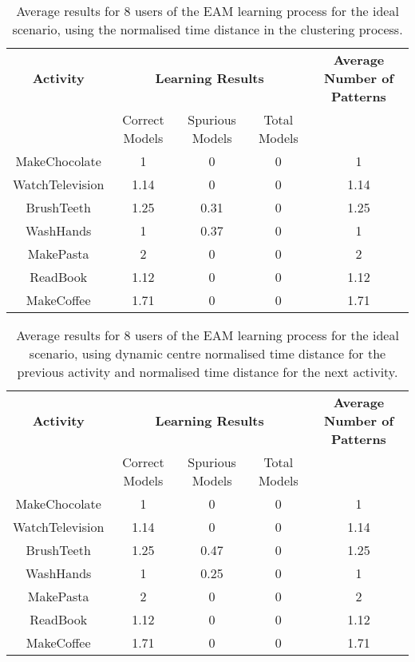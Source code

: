 \begin{table}[htbp]\scriptsize
  \begin{center}
        \begin{tabular}{ccccc}
            \hline            
            \textbf{Activity} & \multicolumn{3}{c}{\textbf{Learning Results}} & \textbf{Average Number of Patterns} \\
             & Correct Models & Spurious Models & Total Models & \\
            \hline
            MakeChocolate   & 1    & 0     & 0  & 1 \\
	    WatchTelevision & 1.14 & 0     & 0  & 1.14    \\
	    BrushTeeth      & 1.25 & 0.31  & 0  & 1.25 \\
	    WashHands       & 1    & 0.37  & 0  & 1 \\
	    MakePasta       & 2    & 0     & 0  & 2 \\
	    ReadBook        & 1.12 & 0     & 0  & 1.12  \\
	    MakeCoffee      & 1.71 & 0     & 0  & 1.71  \\
            \hline
        \end{tabular}
        \caption{Average results for 8 users of the EAM learning process for the ideal scenario, using the normalised time distance in the clustering process.}
        \label{tab-rp-ideal-t1}
    \end{center}
\end{table}



\begin{table}[htbp]\scriptsize
  \begin{center}
        \begin{tabular}{ccccc}
            \hline            
            \textbf{Activity} & \multicolumn{3}{c}{\textbf{Learning Results}} & \textbf{Average Number of Patterns} \\
             & Correct Models & Spurious Models & Total Models & \\
            \hline
            MakeChocolate   & 1    & 0     & 0  & 1 \\
	    WatchTelevision & 1.14 & 0     & 0  & 1.14    \\
	    BrushTeeth      & 1.25 & 0.47  & 0  & 1.25 \\
	    WashHands       & 1    & 0.25  & 0  & 1 \\
	    MakePasta       & 2    & 0     & 0  & 2 \\
	    ReadBook        & 1.12 & 0     & 0  & 1.12  \\
	    MakeCoffee      & 1.71 & 0     & 0  & 1.71  \\
            \hline
        \end{tabular}
        \caption{Average results for 8 users of the EAM learning process for the ideal scenario, using dynamic centre normalised time distance for the previous activity and normalised time distance for the next activity.}
        \label{tab-rp-ideal-t2}
    \end{center}
\end{table}

